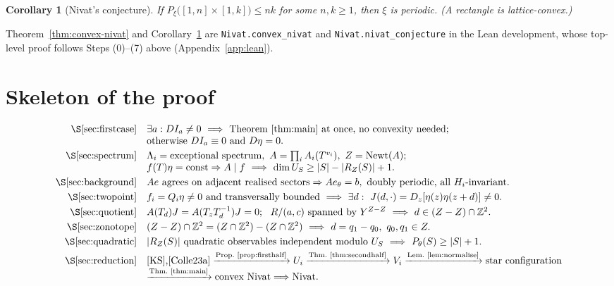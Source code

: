 \documentclass[11pt,reqno]{amsart}
\theoremstyle{plain}
\newtheorem{cor}[thm]{Corollary}
\theoremstyle{definition}
\theoremstyle{remark}
\theoremstyle{plain}
\theoremstyle{remark}
\theoremstyle{definition}
\numberwithin{equation}{section}
\DeclareMathOperator{\Newt}{Newt}
\newcommand{\Z}{\mathbb{Z}}
\begin{document}
\begin{cor}[Nivat's conjecture]\label{cor:nivat}
If $P_\xi\bigl([1,n]\times[1,k]\bigr)\le nk$ for some $n,k\ge1$, then $\xi$ is
periodic.  (A rectangle is lattice-convex.)
\end{cor}

Theorem~\ref{thm:convex-nivat} and Corollary~\ref{cor:nivat} are
\texttt{Nivat.convex\_nivat} and \texttt{Nivat.nivat\_conjecture} in the Lean
development, whose top-level proof follows Steps (0)--(7) above
(Appendix~\ref{app:lean}).

\appendix

\section{Skeleton of the proof}\label{app:skeleton}

\[
\begin{array}{rl}
\text{\S\ref{sec:firstcase}} &
  \exists a:DI_a\ne0\ \Longrightarrow\ \text{Theorem~\ref{thm:main} at once, no
  convexity needed;}\\
  &\text{otherwise }DI_a\equiv0\text{ and }D\eta=0 .\\[3pt]
\text{\S\ref{sec:spectrum}} &
  \Lambda_i=\text{exceptional spectrum},\ A=\prod_iA_i(T^{v_i}),\
  Z=\Newt(A);\\
  & f(T)\eta=\text{const}\Rightarrow A\mid f\ \Longrightarrow\
  \dim U_S\ge|S|-|R_Z(S)|+1 .\\[3pt]
\text{\S\ref{sec:background}} &
  Ae\text{ agrees on adjacent realised sectors}\Rightarrow Ae_\theta=b,\
  \text{doubly periodic, all }H_i\text{-invariant}.\\[3pt]
\text{\S\ref{sec:twopoint}} &
  f_i=Q_i\eta\ne0\text{ and transversally bounded}\ \Longrightarrow\
  \exists d:\ J(d,\cdot)=D_z[\eta(z)\eta(z+d)]\ne0 .\\[3pt]
\text{\S\ref{sec:quotient}} &
  A(T_d)J=A(T_zT_d^{-1})J=0;\ \ R/(a,c)\text{ spanned by }Y^{Z-Z}
  \ \Longrightarrow\ d\in(Z-Z)\cap\Z^2 .\\[3pt]
\text{\S\ref{sec:zonotope}} &
  (Z-Z)\cap\Z^2=(Z\cap\Z^2)-(Z\cap\Z^2)\ \Longrightarrow\ d=q_1-q_0,\
  q_0,q_1\in Z .\\[3pt]
\text{\S\ref{sec:quadratic}} &
  |R_Z(S)|\text{ quadratic observables independent modulo }U_S
  \ \Longrightarrow\ P_\theta(S)\ge|S|+1 .\\[3pt]
\text{\S\ref{sec:reduction}} &
  \text{\cite{KS},\cite{Colle23a}}
  \xrightarrow{\text{Prop.\ \ref{prop:firsthalf}}}U_i
  \xrightarrow{\text{Thm.\ \ref{thm:secondhalf}}}V_i
  \xrightarrow{\text{Lem.\ \ref{lem:normalise}}}\text{star configuration}\\
  &\xrightarrow{\text{Thm.\ \ref{thm:main}}}\text{convex Nivat}
  \Longrightarrow\text{Nivat}.
\end{array}
\]
\end{document}
